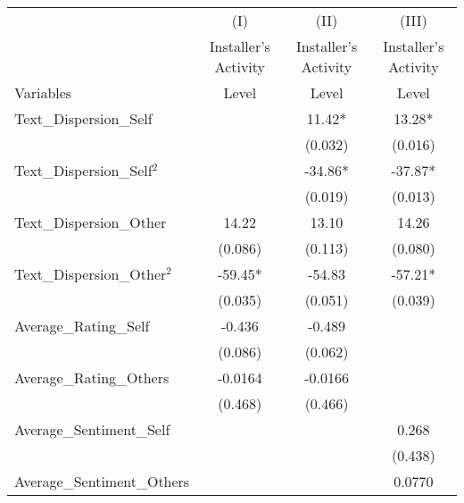 \begin{table}[]
\centering
\begin{threeparttable}
\begin{tabular}{@{}lccc@{}}
\toprule
                  & (I)      & (II)    & (III)   \\
& Installer's Activity & Installer's Activity & Installer's Activity \\
Variables & Level    & Level   & Level   \\ \midrule
Text\_Dispersion\_Self                                 &            & 11.42*     & 13.28*     \\
                                                           &            & (0.032)    & (0.016)    \\
Text\_Dispersion\_Self$^2$    &            & -34.86*    & -37.87*    \\
                                                           &            & (0.019)    & (0.013)    \\
Text\_Dispersion\_Other                                & 14.22      & 13.10      & 14.26      \\
                                                           & (0.086)    & (0.113)    & (0.080)    \\
Text\_Dispersion\_Other$^2$  & -59.45*    & -54.83     & -57.21*    \\
                                                           & (0.035)    & (0.051)    & (0.039)    \\
Average\_Rating\_Self                                             & -0.436     & -0.489     &            \\
                                                           & (0.086)    & (0.062)    &            \\
Average\_Rating\_Others                                    & -0.0164    & -0.0166    &            \\
                                                           & (0.468)    & (0.466)    &            \\
Average\_Sentiment\_Self                                   &            &            & 0.268      \\
                                                           &            &            & (0.438)    \\
Average\_Sentiment\_Others                                 &            &            & 0.0770     \\

\end{tabular}
\end{threeparttable}
\end{table}
